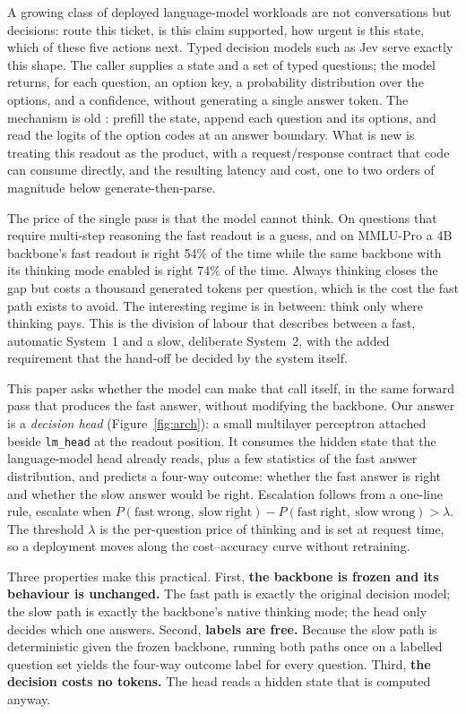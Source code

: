 \documentclass{article}
\newcommand{\fast}{\mathrm{fast}}
\newcommand{\slow}{\mathrm{slow}}
\begin{document}
A growing class of deployed language-model workloads are not conversations but decisions: route this ticket, is this claim supported, how urgent is this state, which of these five actions next. Typed decision models such as Jev \citep{typesafe2026jev} serve exactly this shape. The caller supplies a state and a set of typed questions; the model returns, for each question, an option key, a probability distribution over the options, and a confidence, without generating a single answer token. The mechanism is old \citep{hendrycks2017baseline}: prefill the state, append each question and its options, and read the logits of the option codes at an answer boundary. What is new is treating this readout as the product, with a request/response contract that code can consume directly, and the resulting latency and cost, one to two orders of magnitude below generate-then-parse.

The price of the single pass is that the model cannot think. On questions that require multi-step reasoning the fast readout is a guess, and on MMLU-Pro \citep{wang2024mmlupro} a 4B backbone's fast readout is right 54\% of the time while the same backbone with its thinking mode enabled is right 74\% of the time. Always thinking closes the gap but costs a thousand generated tokens per question, which is the cost the fast path exists to avoid. The interesting regime is in between: think only where thinking pays. This is the division of labour that \citet{kahneman2011thinking} describes between a fast, automatic System~1 and a slow, deliberate System~2, with the added requirement that the hand-off be decided by the system itself.

This paper asks whether the model can make that call itself, in the same forward pass that produces the fast answer, without modifying the backbone. Our answer is a \emph{decision head} (Figure~\ref{fig:arch}): a small multilayer perceptron attached beside \texttt{lm\_head} at the readout position. It consumes the hidden state that the language-model head already reads, plus a few statistics of the fast answer distribution, and predicts a four-way outcome: whether the fast answer is right and whether the slow answer would be right. Escalation follows from a one-line rule, escalate when $P(\fast\ \text{wrong},\ \slow\ \text{right}) - P(\fast\ \text{right},\ \slow\ \text{wrong}) > \lambda$. The threshold $\lambda$ is the per-question price of thinking and is set at request time, so a deployment moves along the cost--accuracy curve without retraining.

Three properties make this practical. First, \textbf{the backbone is frozen and its behaviour is unchanged.} The fast path is exactly the original decision model; the slow path is exactly the backbone's native thinking mode; the head only decides which one answers. Second, \textbf{labels are free.} Because the slow path is deterministic given the frozen backbone, running both paths once on a labelled question set yields the four-way outcome label for every question. Third, \textbf{the decision costs no tokens.} The head reads a hidden state that is computed anyway.
\end{document}
